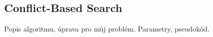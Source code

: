 \subsection{Conflict-Based Search}\label{subsec:conflict_based_search}

Popis algoritmu, úprava pro můj problém.
Parametry, pseudokód.
